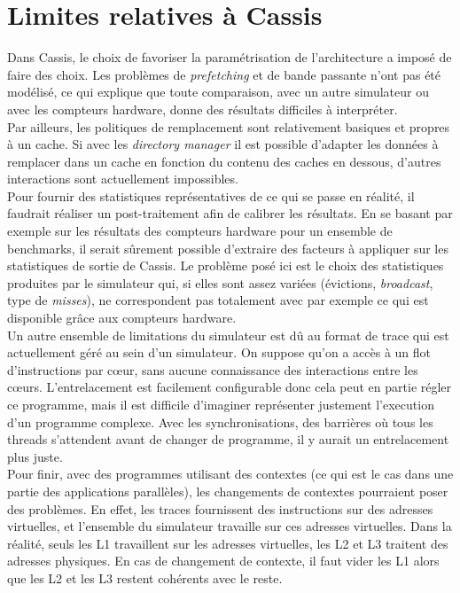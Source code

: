 \section{Limites relatives à \textsf{Cassis}}
Dans \textsf{Cassis}, le choix de favoriser la paramétrisation de l'architecture a imposé de faire des choix. Les problèmes de \emph{prefetching} et de bande passante n'ont pas été modélisé, ce qui explique que toute comparaison, avec un autre simulateur ou avec les compteurs hardware, donne des résultats difficiles à interpréter. \\

Par ailleurs, les politiques de remplacement sont relativement basiques et propres à un cache. Si avec les \emph{directory manager} il est possible d'adapter les données à remplacer dans un cache en fonction du contenu des caches en dessous, d'autres interactions sont actuellement impossibles. \\

Pour fournir des statistiques représentatives de ce qui se passe en réalité, il faudrait réaliser un post-traitement afin de calibrer les résultats. En se basant par exemple sur les résultats des compteurs hardware pour un ensemble de benchmarks, il serait sûrement possible d'extraire des facteurs à appliquer sur les statistiques de sortie de \textsf{Cassis}. Le problème posé ici est le choix des statistiques produites par le simulateur qui, si elles sont assez variées (évictions, \emph{broadcast}, type de \emph{misses}), ne correspondent pas totalement avec par exemple ce qui est disponible grâce aux compteurs hardware. \\

Un autre ensemble de limitations du simulateur est dû au format de trace qui est actuellement géré au sein d'un simulateur. On suppose qu'on a accès à un flot d'instructions par c{\oe}ur, sans aucune connaissance des interactions entre les c{\oe}urs. L'entrelacement est facilement configurable donc cela peut en partie régler ce programme, mais il est difficile d'imaginer représenter justement l'execution d'un programme complexe. Avec les synchronisations, des barrières où tous les threads s'attendent avant de changer de programme, il y aurait un entrelacement plus juste. \\

Pour finir, avec des programmes utilisant des contextes (ce qui est le cas dans une partie des applications parallèles), les changements de contextes pourraient poser des problèmes. En effet, les traces fournissent des instructions sur des adresses virtuelles, et l'ensemble du simulateur travaille sur ces adresses virtuelles. Dans la réalité, seuls les L1 travaillent sur les adresses virtuelles, les L2 et L3 traitent des adresses physiques. En cas de changement de contexte, il faut vider les L1 alors que les L2 et les L3 restent cohérents avec le reste.

